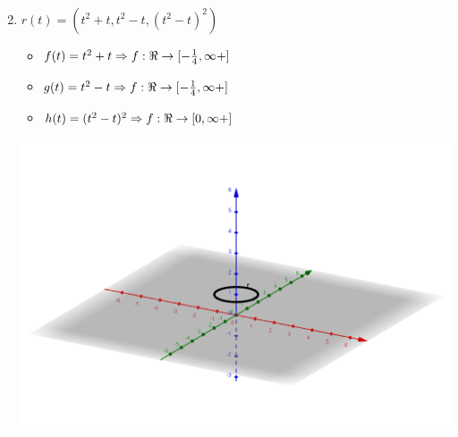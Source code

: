 \documentclass[../practica_02.tex]{subfiles}
\begin{document}
\begin{enumerate}
            $ $

        \item $r(t) = (t^2+t, t^2-t,(t^2-t)^2)$
            \begin{itemize}
                \item $ f(t) = t^2+t \Rightarrow f: \real \rightarrow [-\frac{1}{4},\infty+] $
                \item $ g(t) = t^2-t \Rightarrow f: \real \rightarrow [-\frac{1}{4},\infty+] $
                \item $ h(t) = (t^2-t)^2 \Rightarrow f: \real \rightarrow [0, \infty+] $
            \end{itemize}

            \includegraphics[scale=0.4]{ej10/resources/a.png} $ $

    \end{enumerate}
\end{document}
